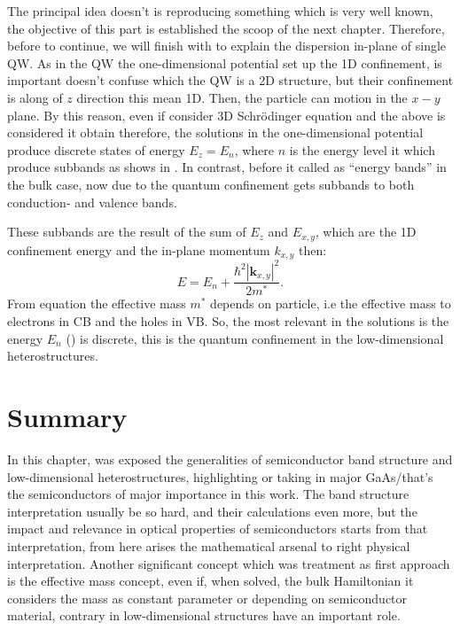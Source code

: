 The principal idea doesn't is reproducing something which is very well known, the objective of this part is established the scoop of the next chapter. Therefore,  before to continue, we will finish with to explain the dispersion in-plane of single QW. As in the QW the one-dimensional potential set up the 1D confinement, is important doesn't confuse which the QW is a 2D structure, but their confinement is along of $z$ direction  this mean 1D. Then, the particle can motion in the $x-y$ plane. By this reason, even if consider 3D Schrödinger equation and  the above is considered it obtain 
therefore, the solutions in the one-dimensional potential produce discrete states of energy $E_{z}=E_{n}$\cite{harrison2016quantum}, where $n$ is the energy level it which produce  subbands as shows in . In contrast, before it called as ``energy bands'' in the bulk case, now due to the quantum confinement gets subbands to both conduction- and valence bands.

These subbands are the result of the sum of $E_{z}$ and $E_{x,y}$, which are the 1D confinement energy and the in-plane momentum $k_{x,y}$ then\cite{harrison2016quantum}:
\begin{equation}\label{eqn:chapter-1-total-enery-ema-aprox}		
	E = E_{n} + \dfrac{\hbar^{2}|\boldsymbol{k}_{x,y}|^{2}}{2m^{*}}.
\end{equation}  
From equation the effective mass  $m^*$ depends on particle, i.e the effective mass to electrons in CB and the holes in VB. So, the most relevant in the solutions is the energy $E_{n}$ ()  is discrete, this is the quantum confinement in the low-dimensional heterostructures. 


\section{Summary}
\vspace{-10mm} 
In this chapter, was exposed the generalities of semiconductor band structure and low-dimensional heterostructures, highlighting or taking in major GaAs/\algaas that's the semiconductors of major importance in this work. 
The band structure interpretation  usually be so hard, and their calculations even more, but the impact and relevance in optical properties of semiconductors starts from that interpretation, from here arises the mathematical arsenal to right physical interpretation. Another significant concept which was treatment as first approach is the effective mass concept, even if, when solved, the bulk Hamiltonian it considers the mass as constant parameter or depending on semiconductor material, contrary  in low-dimensional structures have an important role.  \\

